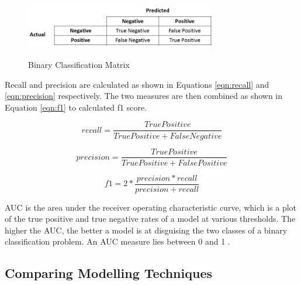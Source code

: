 \vspace{10 pt}

\begin{figure}[!htb]
\centering
\includegraphics[width=0.75\textwidth]{images/f1_matrix.jpeg}
\caption{Binary Classification Matrix}
\label{fig:matrix}
\parencite{f1_image}
\end{figure}

\vspace{10 pt}

Recall and precision are calculated as shown in Equations \ref{eqn:recall} and \ref{eqn:precision} respectively. The two measures are then combined as shown in Equation \ref{eqn:f1} to calculated f1 score. 

\vspace{10pt}

\begin{equation} \label{eqn:recall}
recall = \dfrac{True Positive}{True Positive + False Negative}
\end{equation}

\vspace{10pt}

\begin{equation} \label{eqn:precision}
precision = \dfrac{True Positive}{True Positive + False Positive}
\end{equation}

\vspace{10pt}

\begin{equation} \label{eqn:f1}
f1 = 2 * \dfrac{precision * recall}{precision + recall}
\end{equation}

\vspace{10pt}

AUC is the area under the receiver operating characteristic curve, which is a plot of the true positive and true negative rates of a model at various thresholds. The higher the AUC, the better a model is at disguising the two classes of a binary classification problem. An AUC measure lies between 0 and 1 \parencite{f1}. \\


\subsection{Comparing Modelling Techniques}

